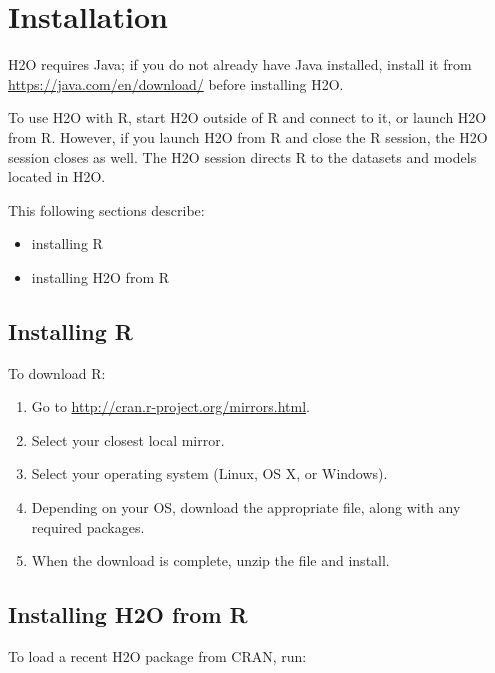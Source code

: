 {\begin{enumerate}
\end{enumerate}




\section{Installation}
H2O requires Java; if you do not already have Java installed, install it from {\url{https://java.com/en/download/}} before installing H2O.

To use H2O with R, start H2O outside of R and connect to it, or launch H2O from R. However, if you launch H2O from R and close the R session, the H2O session closes as well. The H2O session directs R to the datasets and models located in H2O.

This following sections describe: 

\begin{itemize}
\item installing R 
\item installing H2O from R
\end{itemize}

\subsection{Installing R}

To download R:
\begin{enumerate}
\item Go to \url{http://cran.r-project.org/mirrors.html}. 
\item Select your closest local mirror. 
\item Select your operating system (Linux, OS X, or Windows). 
\item Depending on your OS, download the appropriate file, along with any required packages. 
\item When the download is complete, unzip the file and install. \\
\end{enumerate}

\subsection{Installing H2O from R}

To load a recent H2O package from CRAN, run:

\waterExampleInR
\medskip


}
